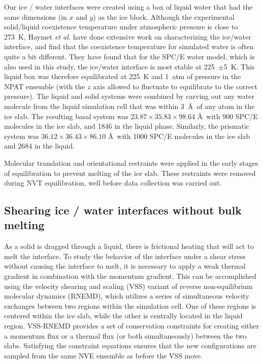 \documentclass[11pt]{article}
\begin{document}
\begin{doublespace}
Our ice / water interfaces were created using a box of liquid water
that had the same dimensions (in $x$ and $y$) as the ice block.
Although the experimental solid/liquid coexistence temperature under
atmospheric pressure is close to 273~K, Haymet \emph{et al.} have done
extensive work on characterizing the ice/water interface, and find
that the coexistence temperature for simulated water is often quite a
bit different.\cite{Karim88,Karim90,Hayward01,Bryk02,Hayward02} They
have found that for the SPC/E water model,\cite{Berendsen87} which is
also used in this study, the ice/water interface is most stable at
225~$\pm$5~K.\cite{Bryk02} This liquid box was therefore equilibrated at
225~K and 1~atm of pressure in the NPAT ensemble (with the $z$ axis
allowed to fluctuate to equilibrate to the correct pressure).  The
liquid and solid systems were combined by carving out any water
molecule from the liquid simulation cell that was within 3~\AA\ of any
atom in the ice slab. The resulting basal system was $23.87 \times 35.83
\times 98.64$ \AA\ with 900 SPC/E molecules in the ice slab, and 1846 in
the liquid phase.  Similarly, the prismatic system was $36.12 \times 36.43
\times 86.10$ \AA\ with 1000 SPC/E molecules in the ice slab and 2684 in
the liquid.

Molecular translation and orientational restraints were applied in the
early stages of equilibration to prevent melting of the ice slab.
These restraints were removed during NVT equilibration, well before
data collection was carried out.  

\subsection{Shearing ice / water interfaces without bulk melting}

As a solid is dragged through a liquid, there is frictional heating
that will act to melt the interface.  To study the behavior of the
interface under a shear stress without causing the interface to melt,
it is necessary to apply a weak thermal gradient in combination with
the momentum gradient.  This can be accomplished using the velocity
shearing and scaling (VSS) variant of reverse non-equilibrium
molecular dynamics (RNEMD), which utilizes a series of simultaneous
velocity exchanges between two regions within the simulation
cell.\cite{Kuang12} One of these regions is centered within the ice
slab, while the other is centrally located in the liquid
region. VSS-RNEMD provides a set of conservation constraints for
creating either a momentum flux or a thermal flux (or both
simultaneously) between the two slabs.  Satisfying the constraint
equations ensures that the new configurations are sampled from the
same NVE ensemble as before the VSS move.


\end{doublespace}
\end{document}
